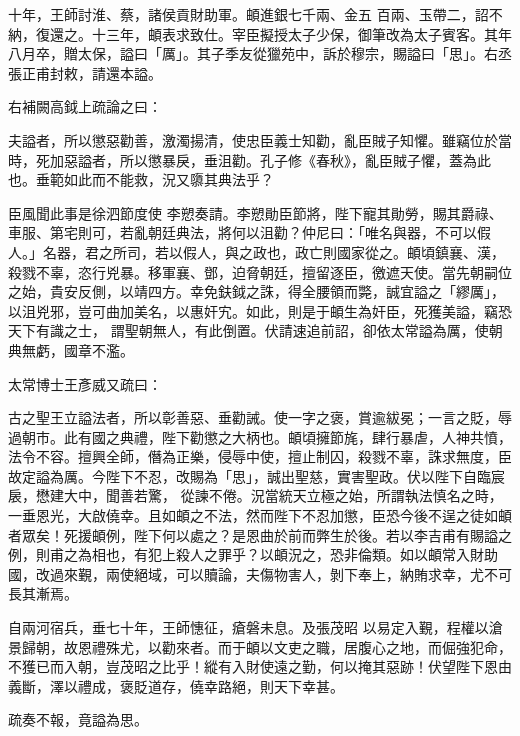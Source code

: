 \begin{pinyinscope}
 十年，王師討淮、蔡，諸侯貢財助軍。頔進銀七千兩、金五
 百兩、玉帶二，詔不納，復還之。十三年，頔表求致仕。宰臣擬授太子少保，御筆改為太子賓客。其年八月卒，贈太保，謚曰「厲」。其子季友從獵苑中，訴於穆宗，賜謚曰「思」。右丞張正甫封敕，請還本謚。



 右補闕高鉞上疏論之曰：



 夫謚者，所以懲惡勸善，激濁揚清，使忠臣義士知勸，亂臣賊子知懼。雖竊位於當時，死加惡謚者，所以懲暴戾，垂沮勸。孔子修《春秋》，亂臣賊子懼，蓋為此也。垂範如此而不能救，況又隳其典法乎？



 臣風聞此事是徐泗節度使
 李愬奏請。李愬勛臣節將，陛下寵其勛勞，賜其爵祿、車服、第宅則可，若亂朝廷典法，將何以沮勸？仲尼曰：「唯名與器，不可以假人。」名器，君之所司，若以假人，與之政也，政亡則國家從之。頔頃鎮襄、漢，殺戮不辜，恣行兇暴。移軍襄、鄧，迫脅朝廷，擅留逐臣，徼遮天使。當先朝嗣位之始，貴安反側，以靖四方。幸免鈇鉞之誅，得全腰領而斃，誠宜謚之「繆厲」，以沮兇邪，豈可曲加美名，以惠奸宄。如此，則是于頔生為奸臣，死獲美謚，竊恐天下有識之士，
 謂聖朝無人，有此倒置。伏請速追前詔，卻依太常謚為厲，使朝典無虧，國章不濫。



 太常博士王彥威又疏曰：



 古之聖王立謚法者，所以彰善惡、垂勸誡。使一字之褒，賞逾紱冕；一言之貶，辱過朝市。此有國之典禮，陛下勸懲之大柄也。頔頃擁節旄，肆行暴虐，人神共憤，法令不容。擅興全師，僭為正樂，侵辱中使，擅止制囚，殺戮不辜，誅求無度，臣故定謚為厲。今陛下不忍，改賜為「思」，誠出聖慈，實害聖政。伏以陛下自臨宸扆，懋建大中，聞善若驚，
 從諫不倦。況當統天立極之始，所謂執法慎名之時，一垂恩光，大啟僥幸。且如頔之不法，然而陛下不忍加懲，臣恐今後不逞之徒如頔者眾矣！死援頔例，陛下何以處之？是恩曲於前而弊生於後。若以李吉甫有賜謚之例，則甫之為相也，有犯上殺人之罪乎？以頔況之，恐非倫類。如以頔常入財助國，改過來覲，兩使絕域，可以贖論，夫傷物害人，剝下奉上，納賄求幸，尤不可長其漸焉。



 自兩河宿兵，垂七十年，王師憓征，瘡磐未息。及張茂昭
 以易定入覲，程權以滄景歸朝，故恩禮殊尤，以勸來者。而于頔以文吏之職，居腹心之地，而倔強犯命，不獲已而入朝，豈茂昭之比乎！縱有入財使遠之勤，何以掩其惡跡！伏望陛下恩由義斷，澤以禮成，褒貶道存，僥幸路絕，則天下幸甚。



 疏奏不報，竟謚為思。




\end{pinyinscope}
